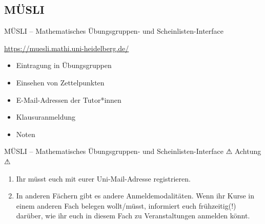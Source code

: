 
\subsection{MÜSLI}
\begin{frame}{MÜSLI -- \normalsize Mathematisches Übungsgruppen- und Scheinlisten-Interface}

    \large \url{https://muesli.mathi.uni-heidelberg.de/}

    \begin{minipage}[t]{0.7\textwidth}

    \begin{itemize}
        \item Eintragung in Übungsgruppen
        \item Einsehen von Zettelpunkten
        \item E-Mail-Adressen der Tutor*innen
        \item Klausuranmeldung
        \item Noten
    \end{itemize}
    \end{minipage}
    \begin{minipage}[t]{0.28\textwidth}
        \vspace*{0em}
        \begin{center}
        \end{center}
    \end{minipage}
\end{frame}

\begin{frame}{MÜSLI -- \normalsize Mathematisches Übungsgruppen- und Scheinlisten-Interface}
    \Large {\LARGE \DejaSans{} ⚠} Achtung {\LARGE \DejaSans{}⚠} \\
    \normalsize
    \begin{enumerate}
        \item{Ihr müsst euch mit eurer Uni-Mail-Adresse registrieren.}
        \item{In anderen Fächern gibt es andere Anmeldemodalitäten. Wenn ihr Kurse in einem anderen Fach belegen wollt/müsst, informiert euch frühzeitig(!) darüber, wie ihr euch in diesem Fach zu Veranstaltungen anmelden könnt.}
    \end{enumerate}
\end{frame}

